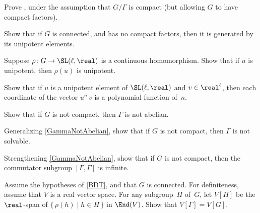 \begin{exercises}

\item \label{BDTCpctFactor}
 Prove , under the assumption that $G/\Gamma$ is compact (but allowing $G$ to have compact factors).

\item \label{<unip>=G}
Show that if $G$ is connected, and has no compact factors, then it is generated by its unipotent elements.

 \item \label{rho(unip)}
Suppose $\rho \colon G \to \SL(\ell,\real)$ is a continuous homomorphism. Show that if $u$ is unipotent, then $\rho(u)$ is unipotent.

\item \label{un=poly}
Show that if $u$ is a unipotent element of $\SL(\ell,\real)$ and $v \in \real^\ell$, then each coordinate of the vector $u^n \, v$ is a polynomial function of~$n$.

\item \label{GammaNotAbelian}
 Show that if $G$ is not compact, then $\Gamma$ is not
abelian.

\item \label{GammaNotSolvable}
 Generalizing \cref{GammaNotAbelian}, show that if
$G$ is not compact, then $\Gamma$ is not solvable.

\item \label{CommGammaInfinite}
 Strengthening \cref{GammaNotAbelian}, show that if
$G$ is not compact, then the commutator subgroup
$[\Gamma,\Gamma]$ is infinite. 

\item Assume the hypotheses of \cref{BDT}, and that $G$ is connected. For
definiteness, assume that $V$ is a real vector space. For
any subgroup~$H$ of~$G$, let $V[H]$ be the $\real$-span of 
 $\{\, \rho(h) \mid h
\in H \,\}$
 in $\End(V)$.
 Show that $V[\Gamma] = V[G]$.
 

\end{exercises}
